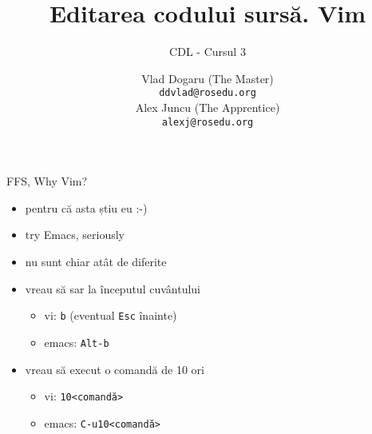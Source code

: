 \documentclass{beamer}
\title[]{Editarea codului surs\u{a}. Vim}
\subtitle{CDL - Cursul 3}
\institute[CDL 2013]{ROSEdu}
\author[]{Vlad Dogaru (The Master) \\ \texttt{ddvlad@rosedu.org} \\ Alex Juncu (The Apprentice)\\
\texttt{alexj@rosedu.org}}
\begin{document}
\maketitle

\tableofcontents

\begin{frame}{FFS, Why Vim?}
  \begin{itemize}
    \item pentru că asta știu eu :-)
    \pause
    \item try Emacs, seriously
    \pause
    \item nu sunt chiar atât de diferite
    \pause
    \item vreau să sar la începutul cuvântului
    \begin{itemize}
      \item vi: \texttt{b} (eventual \texttt{Esc} înainte)
      \item emacs: \texttt{Alt-b}
    \end{itemize}
    \item vreau să execut o comandă de 10 ori
    \begin{itemize}
      \item vi: \texttt{10<comandă>}
      \item emacs: \texttt{C-u10<comandă>}
    \end{itemize}
    \pause
  \end{itemize}
\end{frame}
\end{document}
